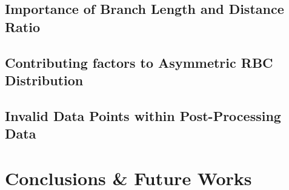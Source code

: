 \documentclass[a4paper, 11pt]{article}
\numberwithin{figure}{subsection}
\numberwithin{table}{subsection}
\begin{document}
\subsection{Importance of Branch Length and Distance Ratio}
\label{BranchLength_DistanceRatio}


\subsection{Contributing factors to Asymmetric RBC Distribution}
\label{ContributingFactorsTOAsymmetricRBCDistribution}


\subsection{Invalid Data Points within Post-Processing Data}
\label{InvalidDataPoints}



\newpage
\section{Conclusions \& Future Works}



\newpage


\end{document}
